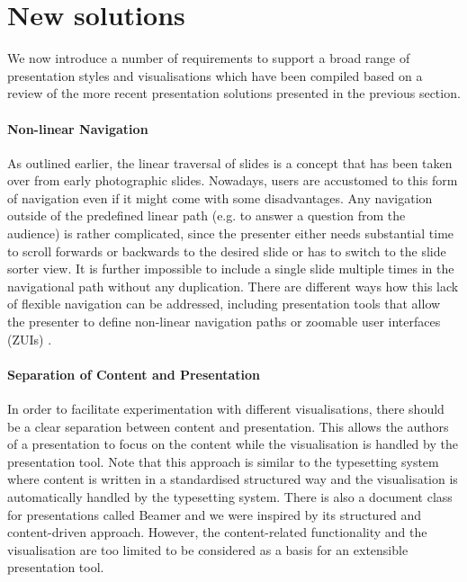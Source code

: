   \section{New solutions}

   We now introduce a number of requirements to support a broad range of
   presentation styles and visualisations which have been compiled based on a
   review of the more recent presentation solutions presented in the previous
   section.

     \paragraph{Non-linear Navigation} As outlined earlier, the linear
      traversal of slides is a concept that has been taken over from early
      photographic slides. Nowadays, users are accustomed to this form of
      navigation even if it might come with some disadvantages. Any navigation
      outside of the predefined linear path (e.g. to answer a question from the
      audience) is rather complicated, since the presenter either needs
      substantial time to scroll forwards or backwards to the desired slide or
      has to switch to the slide sorter view. It is further impossible to
      include a single slide multiple times in the navigational path without
      any duplication. There are different ways how this lack of flexible
      navigation can be addressed, including presentation tools that allow the
      presenter to define non-linear navigation paths \citep{spicer-1}
      \citep{edge-1} or zoomable user interfaces (ZUIs) \citep{good-1}
      \citep{lichtschlag-1} \citep{haller-1}.

     \paragraph{Separation of Content and Presentation} In order to facilitate
      experimentation with different visualisations, there should be a clear
      separation between content and presentation. This allows the authors of a
      presentation to focus on the content while the visualisation is handled
      by the presentation tool. Note that this approach is similar to the
      \latex typesetting system where content is written in a standardised
      structured way and the visualisation is automatically handled by the
      typesetting system. There is also a \latex document class for
      presentations called Beamer and we were inspired by its structured and
      content-driven approach. However, the content-related functionality and
      the visualisation are too limited to be considered as a basis for an
      extensible presentation tool.

